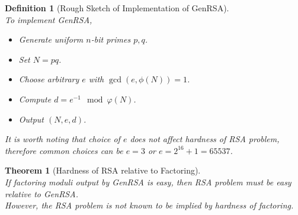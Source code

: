\documentclass[12pt]{article}
\newtheorem{definition}{Definition}[section]
\newtheorem{theorem}{Theorem}[section]
\theoremstyle{definition}
\begin{document}
\begin{definition}[Rough Sketch of Implementation of GenRSA]
\hfill\\\normalfont To implement GenRSA,
\begin{itemize}
  \item Generate uniform $n$-bit primes $p,q$.
  \item Set $N=pq$.
  \item Choose arbitrary $e$ with $\gcd(e,\phi(N))=1$.
  \item Compute $d=e^{-1}\mod \varphi(N)$.
  \item Output $(N,e,d)$.
\end{itemize}
It is worth noting that choice of $e$ does not affect hardness of RSA problem, therefore common choices can be $e=3$ or $e=2^{16}+1=65537$.
\end{definition}
\begin{theorem}[Hardness of RSA relative to Factoring]
\hfill\\\normalfont If factoring moduli output by GenRSA is easy, then RSA problem must be easy relative to GenRSA.\\
However, the RSA problem is not known to be implied by hardness of factoring.
\end{theorem}
\end{document}
